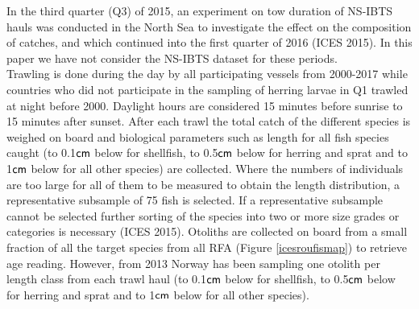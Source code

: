 \documentclass[a4paper 12pt]{article}
\numberwithin{equation}{section}
\newcommand{\cm}{\textnormal{\sffamily cm}\xspace}
\begin{document}
\indent  In the third quarter (Q3) of 2015, an experiment on tow duration of NS-IBTS hauls was conducted in the North Sea to investigate the effect on the composition of catches, and which continued into the first quarter of 2016 (ICES 2015). In this paper we have not consider the NS-IBTS dataset for these periods.\\
\indent Trawling is done during the day by all participating vessels from 2000-2017 while countries who did not participate in the sampling of herring larvae in Q1 trawled at night before 2000. Daylight hours are considered 15 minutes before sunrise to 15 minutes  after sunset. After each trawl the total catch of the different species is weighed on board and biological parameters such as length for all fish species caught (to 0.1$\cm$ below for shellfish, to 0.5$\cm$ below for herring and sprat and to 1$\cm$ below for all other species) are collected. Where the numbers of individuals are too large for all of them  to be measured to obtain the length distribution, a representative subsample of 75 fish is selected. If a representative subsample cannot be selected further sorting of the species into two or more size grades or categories is necessary (ICES 2015). Otoliths are collected on board from a small fraction of all the target species from all RFA (Figure \ref{icesroufismap}) to retrieve age reading. However, from 2013 Norway has been sampling one otolith per length class from each trawl haul (to 0.1$\cm$ below for shellfish, to 0.5$\cm$ below for herring and sprat and to 1$\cm$ below for all other species).   \\ 
\end{document}
